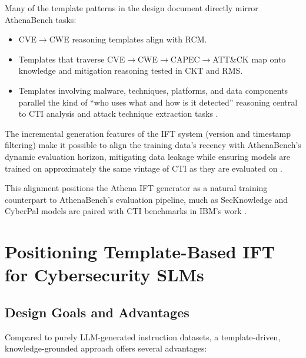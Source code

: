 \documentclass[unnumsec,webpdf,contemporary,large]{oup-authoring-template}
\theoremstyle{thmstyleone}
\theoremstyle{thmstyletwo}
\theoremstyle{thmstylethree}
\begin{document}
Many of the template patterns in the design document directly mirror AthenaBench tasks:
\begin{itemize}
  \item CVE$\rightarrow$CWE reasoning templates align with RCM.
  \item Templates that traverse CVE$\rightarrow$CWE$\rightarrow$CAPEC$\rightarrow$ATT\&CK map onto knowledge and mitigation reasoning tested in CKT and RMS.
  \item Templates involving malware, techniques, platforms, and data components parallel the kind of ``who uses what and how is it detected'' reasoning central to CTI analysis and attack technique extraction tasks \cite{cardei2025ift}.
\end{itemize}

The incremental generation features of the IFT system (version and timestamp filtering) make it possible to align the training data's recency with AthenaBench's dynamic evaluation horizon, mitigating data leakage while ensuring models are trained on approximately the same vintage of CTI as they are evaluated on \cite{cardei2025ift,alam2025athenabench}.

This alignment positions the Athena IFT generator as a natural training counterpart to AthenaBench's evaluation pipeline, much as SecKnowledge and CyberPal models are paired with CTI benchmarks in IBM's work \cite{levi2024cyberpal,levi2025toward}.

\section{Positioning Template-Based IFT for Cybersecurity SLMs}
\label{sec:athena-ift}

\subsection{Design Goals and Advantages}

Compared to purely LLM-generated instruction datasets, a template-driven, knowledge-grounded approach offers several advantages:
\end{document}
